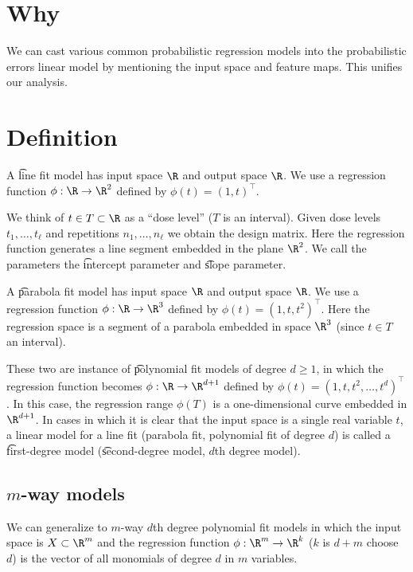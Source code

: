 

\section*{Why}

We can cast various common probabilistic regression models into the probabilistic errors linear model by mentioning the input space and feature maps.
This unifies our analysis.

\section*{Definition}


A \t{line fit model} has input space $\R $ and output space $\R $.
We use a regression function $\phi : \R  \to \R ^2$ defined by $\phi (t) = (1, t)^\top $.

We think of $t \in T \subset \R $ as a ``dose level'' ($T$ is an interval).
Given dose levels $t_1, \dots , t_\ell $ and repetitions $n_1, \dots , n_\ell $ we obtain the design matrix.
Here the regression function generates a line segment embedded in the plane $\R ^2$.
We call the parameters the \t{intercept parameter} and \t{slope parameter}.

A \t{parabola fit model} has input space $\R $ and output space $\R $.
We use a regression function $\phi : \R  \to \R ^3$ defined by $\phi (t) = (1, t, t^2)^\top $.
Here the regression space is a segment of a parabola embedded in space $\R ^3$ (since $t \in T$ an interval).

These two are instance of \t{polynomial fit models} of degree $d \geq 1$, in which the regression function becomes $\phi : \R \to \R ^{d + 1}$ defined by $\phi (t) = (1, t, t^2, \dots , t^d)^\top $.
In this case, the regression range $\phi (T)$ is a one-dimensional curve embedded in $\R ^{d+1}$.
In cases in which it is clear that the input space is a single real variable $t$, a linear model for a line fit (parabola fit, polynomial fit of degree $d$) is called a \t{first-degree model} (\t{second-degree model}, \t{$d$th degree model}).

\subsection*{$m$-way models}

We can generalize to \t{$m$-way $d$th degree polynomial fit models} in which the input space is $X \subset \R ^m$ and the regression function $\phi : \R ^m \to \R ^k$ ($k$ is $d+m$ choose $d$) is the vector of all monomials of degree $d$ in $m$ variables.

